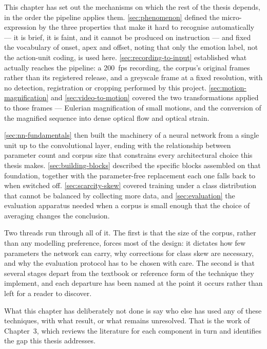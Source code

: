 This chapter has set out the mechanisms on which the rest of the thesis depends, in the order the pipeline applies them. \autoref{sec:phenomenon} defined the micro-expression by the three properties that make it hard to recognise automatically --- it is brief, it is faint, and it cannot be produced on instruction --- and fixed the vocabulary of onset, apex and offset, noting that only the emotion label, not the action-unit coding, is used here. \autoref{sec:recording-to-input} established what actually reaches the pipeline: a 200~fps recording, the corpus's original frames rather than its registered release, and a greyscale frame at a fixed resolution, with no detection, registration or cropping performed by this project. \autoref{sec:motion-magnification} and \autoref{sec:video-to-motion} covered the two transformations applied to those frames --- Eulerian magnification of small motions, and the conversion of the magnified sequence into dense optical flow and optical strain.

\autoref{sec:nn-fundamentals} then built the machinery of a neural network from a single unit up to the convolutional layer, ending with the relationship between parameter count and corpus size that constrains every architectural choice this thesis makes. \autoref{sec:building-blocks} described the specific blocks assembled on that foundation, together with the parameter-free replacement each one falls back to when switched off. \autoref{sec:scarcity-skew} covered training under a class distribution that cannot be balanced by collecting more data, and \autoref{sec:evaluation} the evaluation apparatus needed when a corpus is small enough that the choice of averaging changes the conclusion.

Two threads run through all of it. The first is that the size of the corpus, rather than any modelling preference, forces most of the design: it dictates how few parameters the network can carry, why corrections for class skew are necessary, and why the evaluation protocol has to be chosen with care. The second is that several stages depart from the textbook or reference form of the technique they implement, and each departure has been named at the point it occurs rather than left for a reader to discover.

What this chapter has deliberately not done is say who else has used any of these techniques, with what result, or what remains unresolved. That is the work of Chapter~3, which reviews the literature for each component in turn and identifies the gap this thesis addresses.
